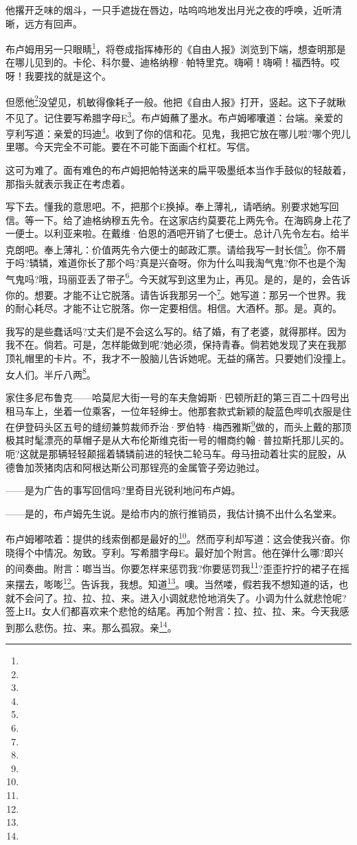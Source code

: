 \par 他撂开乏味的烟斗，一只手遮拢在唇边，咕呜呜地发出月光之夜的呼唤，近听清晰，远方有回声。
\par 布卢姆用另一只眼睛\footnote{}，将卷成指挥棒形的《自由人报》浏览到下端，想查明那是在哪儿见到的。卡伦、科尔曼、迪格纳穆·帕特里克。嗨嗬！嗨嗬！福西特。哎呀！我要找的就是这个。
\par 但愿他\footnote{}没望见，机敏得像耗子一般。他把《自由人报》打开，竖起。这下子就瞅不见了。记住要写希腊字母E\footnote{}。布卢姆蘸了墨水。布卢姆嘟囔道：台端。亲爱的亨利写道：亲爱的玛迪\footnote{}。收到了你的信和花。见鬼，我把它放在哪儿啦?哪个兜儿里哪。今天完全不可能。要在不可能下面画个杠杠。写信。
\par 这可为难了。面有难色的布卢姆把帕特送来的扁平吸墨纸本当作手鼓似的轻敲着，那指头就表示我正在考虑着。
\par 写下去。懂我的意思吧。不，把那个E换掉。奉上薄礼，请哂纳。别要求她写回信。等一下。给了迪格纳穆五先令。在这家店约莫要花上两先令。在海鸥身上花了一便士。以利亚来啦。在戴维·伯恩的酒吧开销了七便士。总计八先令左右。给半克朗吧。奉上薄礼：价值两先令六便士的邮政汇票。请给我写一封长信\footnote{}。你不屑于吗?辚辚，难道你长了那个吗?真是兴奋呀。你为什么叫我淘气鬼?你不也是个淘气鬼吗?哦，玛丽亚丢了带子\footnote{}。今天就写到这里为止，再见。是的，是的，会告诉你的。想要。才能不让它脱落。请告诉我那另一个\footnote{}。她写道：那另一个世界。我的耐心耗尽。才能不让它脱落。你一定要相信。相信。大酒杯。那。是。真的。
\par 我写的是些蠢话吗?丈夫们是不会这么写的。结了婚，有了老婆，就得那样。因为我不在。倘若。可是，怎样能做到呢?她必须，保持青春。倘若她发现了夹在我那顶礼帽里的卡片。不，我才不一股脑儿告诉她呢。无益的痛苦。只要她们没撞上。女人们。半斤八两\footnote{}。
\par 家住多尼布鲁克——哈莫尼大街一号的车夫詹姆斯·巴顿所赶的第三百二十四号出租马车上，坐着一位乘客，一位年轻绅士。他那套款式新颖的靛蓝色哔叽衣服是住在伊登码头区五号的缝纫兼剪裁师乔治·罗伯特·梅西雅斯\footnote{}做的，而头上戴的那顶极其时髦漂亮的草帽子是从大布伦斯维克街一号的帽商约翰·普拉斯托那儿买的。呃?这就是那辆轻轻颠摇着辚辚前进的轻快二轮马车。母马扭动着壮实的屁股，从德鲁加茨猪肉店和阿根达斯公司那锃亮的金属管子旁边驰过。
\par ——是为广告的事写回信吗?里奇目光锐利地问布卢姆。
\par ——是的，布卢姆先生说。是给市内的旅行推销员，我估计搞不出什么名堂来。
\par 布卢姆嘟哝着：提供的线索倒都是最好的\footnote{}。然而亨利却写道：这会使我兴奋。你晓得个中情况。匆致。亨利。写希腊字母E。最好加个附言。他在弹什么哪?即兴的间奏曲。附言：啷当当。你要怎样来惩罚我?你要惩罚我\footnote{}?歪歪拧拧的裙子在摇来摆去，嘭嘭\footnote{}。告诉我，我想。知道\footnote{}。噢。当然喽，假若我不想知道的话，也就不会问了。拉、拉、拉、来。进入小调就悲怆地消失了。小调为什么就悲怆呢?签上H。女人们都喜欢来个悲怆的结尾。再加个附言：拉、拉、拉、来。今天我感到那么悲伤。拉、来。那么孤寂。亲\footnote{}。
